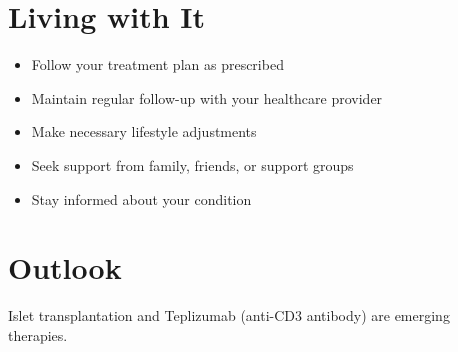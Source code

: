 \section{Living with It}
\begin{itemize}[noitemsep]
  \item Follow your treatment plan as prescribed
  \item Maintain regular follow-up with your healthcare provider
  \item Make necessary lifestyle adjustments
  \item Seek support from family, friends, or support groups
  \item Stay informed about your condition
\end{itemize}
\section{Outlook}
Islet transplantation and Teplizumab (anti-CD3 antibody) are emerging therapies.
